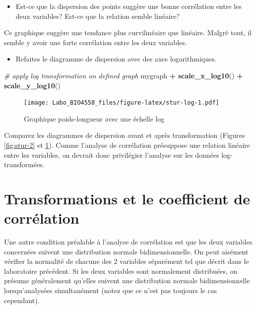 \documentclass[12pt,]{book}
\newenvironment{Shaded}{\begin{snugshade}}{\end{snugshade}}
\newcommand{\CommentTok}[1]{\textcolor[rgb]{0.56,0.35,0.01}{\textit{#1}}}
\newcommand{\KeywordTok}[1]{\textcolor[rgb]{0.13,0.29,0.53}{\textbf{#1}}}
\newcommand{\NormalTok}[1]{#1}
\newcommand{\OperatorTok}[1]{\textcolor[rgb]{0.81,0.36,0.00}{\textbf{#1}}}
\newcommand{\StringTok}[1]{\textcolor[rgb]{0.31,0.60,0.02}{#1}}
\providecommand{\tightlist}{%
  \setlength{\itemsep}{0pt}\setlength{\parskip}{0pt}}
\begin{document}
\begin{itemize}
\tightlist
\item
  Est-ce que la dispersion des points suggère une bonne corrélation entre les deux variables?
  Est-ce que la relation semble linéaire?
\end{itemize}

Ce graphique suggère une tendance plus curvilinéaire que linéaire.
Malgré tout, il semble y avoir une forte corrélation entre les deux variables.

\begin{itemize}
\tightlist
\item
  Refaites le diagramme de dispersion avec des axes logarithmiques.
\end{itemize}

\begin{Shaded}
\begin{Highlighting}[]
\CommentTok{# apply log transformation on defined graph}
\NormalTok{mygraph }\OperatorTok{+}\StringTok{ }\KeywordTok{scale_x_log10}\NormalTok{() }\OperatorTok{+}\StringTok{ }\KeywordTok{scale_y_log10}\NormalTok{()}
\end{Highlighting}
\end{Shaded}

\begin{figure}
\centering
\texttt{[image: Labo\_BIO4558\_files/figure-latex/stur-log-1.pdf]}
\caption{\label{fig:stur-log}Graphique poids-longueur avec une échelle log}
\end{figure}

Comparez les diagrammes de dispersion avant et après transformation (Figures \ref{fig:stur-2} et \ref{fig:stur-log}). Comme l'analyse de corrélation présuppose une relation linéaire entre les variables, on devrait donc privilégier l'analyse sur les données log-transformées.

\hypertarget{transformations-et-le-coefficient-de-corruxe9lation}{%
\section{Transformations et le coefficient de corrélation}\label{transformations-et-le-coefficient-de-corruxe9lation}}

Une autre condition préalable à l'analyse de corrélation est que les deux variables concernées suivent une distribution normale bidimensionnelle.
On peut aisément vérifier la normalité de chacune des 2 variables séparément tel que décrit dans le laboratoire précédent.
Si les deux variables sont normalement distribuées, on présume généralement qu'elles suivent une distribution normale bidimensionnelle lorsqu'analysées simultanément (notez que ce n'est pas toujours le cas cependant).
\end{document}
